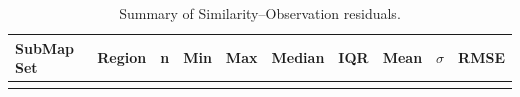 \documentclass[final]{agujournal2019}
\begin{document}
\begin{longtable}[]{@{}
  >{\raggedright\arraybackslash}p{}
  >{\raggedleft\arraybackslash}p{}
  >{\raggedleft\arraybackslash}p{}
  >{\raggedleft\arraybackslash}p{}
  >{\raggedleft\arraybackslash}p{}
  >{\raggedleft\arraybackslash}p{}
  >{\raggedleft\arraybackslash}p{}
  >{\raggedleft\arraybackslash}p{}
  >{\raggedleft\arraybackslash}p{}
  >{\raggedleft\arraybackslash}p{}@{}}
\caption{Summary of Similarity--Observation
residuals.}\label{tbl:sim-residual-summary}\tabularnewline
\toprule\noalign{}
\begin{minipage}[b]{\linewidth}\raggedright
SubMap Set
\end{minipage} & \begin{minipage}[b]{\linewidth}\raggedleft
Region
\end{minipage} & \begin{minipage}[b]{\linewidth}\raggedleft
n
\end{minipage} & \begin{minipage}[b]{\linewidth}\raggedleft
Min
\end{minipage} & \begin{minipage}[b]{\linewidth}\raggedleft
Max
\end{minipage} & \begin{minipage}[b]{\linewidth}\raggedleft
Median
\end{minipage} & \begin{minipage}[b]{\linewidth}\raggedleft
IQR
\end{minipage} & \begin{minipage}[b]{\linewidth}\raggedleft
Mean
\end{minipage} & \begin{minipage}[b]{\linewidth}\raggedleft
\(\sigma\)
\end{minipage} & \begin{minipage}[b]{\linewidth}\raggedleft
RMSE
\end{minipage} \\
\midrule\noalign{}
\endfirsthead
\toprule\noalign{}
\begin{minipage}[b]{\linewidth}\raggedright

\end{minipage}
\end{longtable}
\end{document}

